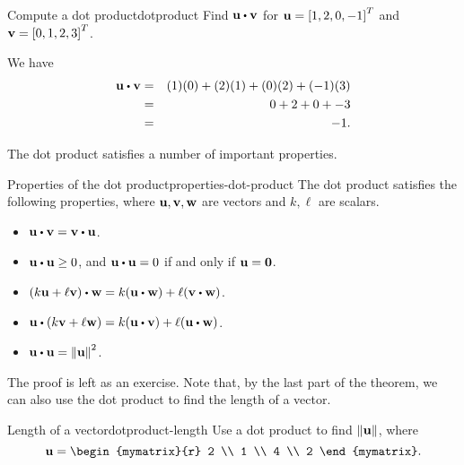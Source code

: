 \begin{example}{Compute a dot product}{dotproduct}
  Find $\vect{u} \dotprod \vect{v}$ for $\mbox{\bf u}=\left[1,2,0,-1\right]^T$
  and $\mbox{\bf v}=\left[0,1,2,3\right]^T$.
\end{example}

\begin{solution}
  We have
  \begin{eqnarray*}
    \vect{u} \dotprod \vect{v}
    &=&
        (1)(0) + (2)(1) + (0)(2) + (-1)(3) \\
    &=&
        0 + 2 + 0 + -3 \\
    &=&
        -1.
  \end{eqnarray*}
\end{solution}

The dot product satisfies a number of important properties.

\begin{theorem}{Properties of the dot product}{properties-dot-product}
  The dot product satisfies the following properties, where
  $\mbox{\bf u},\mbox{\bf v},\mbox{\bf w}$ are vectors and $k,\ell$ are
  scalars.
  \begin{itemize}
  \item $\vect{u}\dotprod\vect{v}=\vect{v}\dotprod\vect{u}$.
  \item $\vect{u}\dotprod\vect{u}\geq 0$, and $\vect{u}\dotprod\vect{u}=0$ if and only if $\mbox{\bf u}=\mbox{\bf 0}$.
  \item $(k\vect{u}+\ell\vect{v})\dotprod\vect{w}=k(\vect{u}\dotprod\vect{w})+\ell(\vect{v}\dotprod\vect{w})$.
  \item $\vect{u}\dotprod(k\vect{v}+\ell\vect{w})
    =k(\vect{u}\dotprod \vect{v})+\ell(\vect{u}\dotprod\vect{w})$.
  \item $\vect{u}\dotprod\vect{u}=\norm{\vect{u}}^{2}$.
  \end{itemize}
\end{theorem}

The proof is left as an exercise. Note that, by the last part of the
theorem, we can also use the dot product to find the length of a
vector.

\begin{example}{Length of a vector}{dotproduct-length}
  Use a dot product to find $\left\|\mbox{\bf u}\right\|$, where
  \begin{equation*}
    \vect{u}
    =
    \begin{mymatrix}{r}
      2 \\
      1 \\
      4 \\
      2
    \end{mymatrix}.
  \end{equation*}
\end{example}

